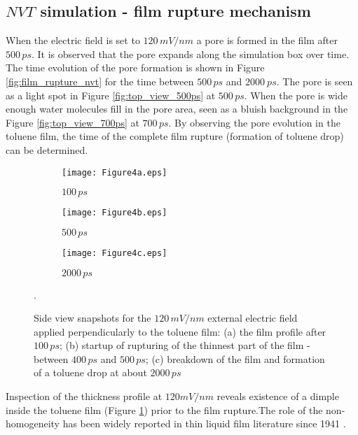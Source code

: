 \subsection{$NVT$ simulation - film rupture mechanism}
When the electric field is set to $120\, mV/nm$ a pore is formed in  the film after $500\, ps$. It is observed that the pore expands along the simulation box over time. The time evolution of the pore formation is shown in Figure \ref{fig:film_rupture_nvt} for the time between  $500\, ps$ and $2000\ ps$. The pore is seen as a light spot in Figure \ref{fig:top_view_500ps} at $500\, ps$. When the pore is wide enough water molecules fill in the pore area, seen as a bluish background in the Figure \ref{fig:top_view_700ps} at $700\, ps$. By observing the pore evolution in the toluene film, the time of the complete film rupture (formation of toluene drop)  can be determined.
  

\begin{figure}[h]
\centering
\begin{subfigure}{.32\textwidth}
  \centering
  \texttt{[image: Figure4a.eps]}
  \caption{$100\, ps$}
  \label{fig:side_view_100ps}
\end{subfigure}%
\begin{subfigure}{.32\textwidth}
  \centering
  \texttt{[image: Figure4b.eps]}
  \caption{$500\, ps$}
  \label{fig:side_view_500ps}
\end{subfigure}
\begin{subfigure}{.32\textwidth}%
  \centering
  \texttt{[image: Figure4c.eps]}
  \caption{$2000\, ps$}
  \label{fig:side_view_1500ps}
\end{subfigure}
\caption{Side view snapshots for the $120\, mV/nm$ external electric field applied  perpendicularly to the toluene film:  (a) the film profile after $100\, ps$; (b) startup of rupturing of the thinnest part of the film - between $400\, ps$ and $500\, ps$;  (c) breakdown of the film and formation of a toluene drop at about $2000\, ps$}.
\label{fig:nvt_side_view_film_rupture}
\end{figure}

Inspection of the thickness profile at $120 mV/nm$ reveals existence of a dimple inside the toluene film (Figure \ref{fig:side_view_100ps}) prior to the film rupture.The role of the non-homogeneity has been widely reported in thin liquid film literature since 1941 \cite{Landau_1941}. 

